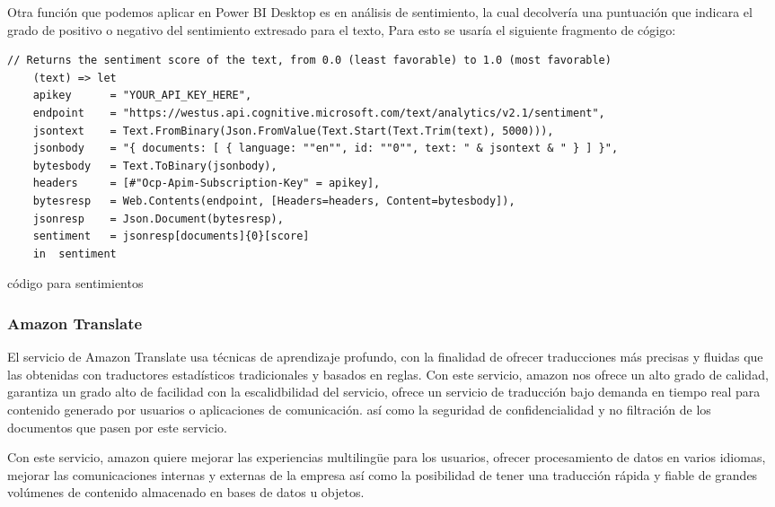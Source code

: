 \documentclass[english,runningheads,a4paper]{llncs}[2018/03/10]
\begin{document}
    Otra función que podemos aplicar en Power BI Desktop es en análisis de 
    sentimiento, la cual decolvería una puntuación que indicara el grado de 
    positivo o negativo del sentimiento extresado para el texto, Para esto se 
    usaría el siguiente fragmento de cógigo:
    \small{
      \begin{listing}[]
        \centering
            \begin{verbatim}
// Returns the sentiment score of the text, from 0.0 (least favorable) to 1.0 (most favorable)
    (text) => let
    apikey      = "YOUR_API_KEY_HERE",
    endpoint    = "https://westus.api.cognitive.microsoft.com/text/analytics/v2.1/sentiment",
    jsontext    = Text.FromBinary(Json.FromValue(Text.Start(Text.Trim(text), 5000))),
    jsonbody    = "{ documents: [ { language: ""en"", id: ""0"", text: " & jsontext & " } ] }",
    bytesbody   = Text.ToBinary(jsonbody),
    headers     = [#"Ocp-Apim-Subscription-Key" = apikey],
    bytesresp   = Web.Contents(endpoint, [Headers=headers, Content=bytesbody]),
    jsonresp    = Json.Document(bytesresp),
    sentiment   = jsonresp[documents]{0}[score]
    in  sentiment
            \end{verbatim}
        \caption{código para sentimientos}
        \label{lst::comand}
        \end{listing}
    }
    \subsubsection{Amazon Translate}
    El servicio de Amazon Translate usa técnicas de aprendizaje profundo, con 
    la finalidad de ofrecer traducciones más precisas y fluidas que las 
    obtenidas con traductores estadísticos tradicionales y basados en reglas.
    Con este servicio, amazon nos ofrece un alto grado de calidad, garantiza un 
    grado alto de facilidad con la escalidbilidad del servicio, ofrece un 
    servicio de traducción bajo demanda en tiempo real para contenido generado 
    por usuarios o aplicaciones de comunicación. así como la seguridad de 
    confidencialidad y no filtración de los documentos que pasen por este 
    servicio.
    
    Con este servicio, amazon quiere mejorar las experiencias multilingüe para 
    los usuarios, ofrecer procesamiento de datos en varios idiomas, mejorar las 
    comunicaciones internas y externas de la empresa así como la posibilidad de 
    tener una traducción rápida y fiable de grandes volúmenes de contenido 
    almacenado en bases de datos u objetos.
    
\end{document}

